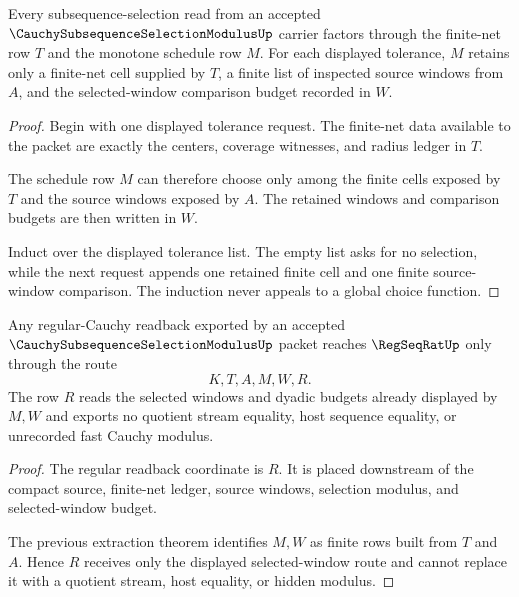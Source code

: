 \begin{theorem}
\label{thm:cauchy-subsequence-selection-modulus-finite-net-extraction}
Every subsequence-selection read from an accepted $\CauchySubsequenceSelectionModulusUp$ carrier factors through the finite-net row $T$ and the monotone schedule row $M$. For each displayed tolerance, $M$ retains only a finite-net cell supplied by $T$, a finite list of inspected source windows from $A$, and the selected-window comparison budget recorded in $W$.
\end{theorem}
\begin{proof}
Begin with one displayed tolerance request. The finite-net data available to the packet are exactly the centers, coverage witnesses, and radius ledger in $T$.

The schedule row $M$ can therefore choose only among the finite cells exposed by $T$ and the source windows exposed by $A$. The retained windows and comparison budgets are then written in $W$.

Induct over the displayed tolerance list. The empty list asks for no selection, while the next request appends one retained finite cell and one finite source-window comparison. The induction never appeals to a global choice function.
\end{proof}

\begin{theorem}
\label{thm:cauchy-subsequence-selection-modulus-regular-handoff}
Any regular-Cauchy readback exported by an accepted $\CauchySubsequenceSelectionModulusUp$ packet reaches $\RegSeqRatUp$ only through the route
$$
K,T,A,M,W,R .
$$
The row $R$ reads the selected windows and dyadic budgets already displayed by $M,W$ and exports no quotient stream equality, host sequence equality, or unrecorded fast Cauchy modulus.
\end{theorem}
\begin{proof}
The regular readback coordinate is $R$. It is placed downstream of the compact source, finite-net ledger, source windows, selection modulus, and selected-window budget.

The previous extraction theorem identifies $M,W$ as finite rows built from $T$ and $A$. Hence $R$ receives only the displayed selected-window route and cannot replace it with a quotient stream, host equality, or hidden modulus.
\end{proof}

